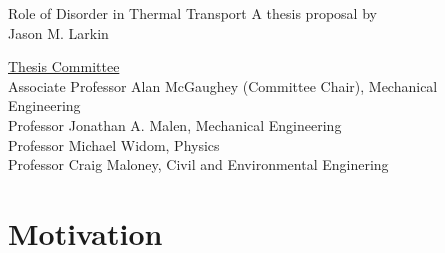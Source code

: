 \documentclass[letterpaper,12pt]{article}
\begin{document}
\begin{center}
\centering
\vspace{1.1in}
\LARGE Role of Disorder in Thermal Transport\Large
\vspace{1in} A thesis proposal by\\Jason M. Larkin\\
\vspace{1.1in}
\parbox[h]{4in}{}
\thispagestyle{empty}
\end{center}
\vspace{2.in}
\parbox[b]{6.5in}{\noindent \underline{Thesis Committee}\\
\noindent Associate Professor Alan McGaughey (Committee Chair), Mechanical Engineering\\
Professor Jonathan A. Malen, Mechanical Engineering \\
Professor Michael Widom, Physics \\
Professor Craig Maloney, Civil and Environmental Enginering\\}
\clearpage
\tableofcontents
\clearpage
\section{\label{S-Motivation}Motivation}
\end{document}
